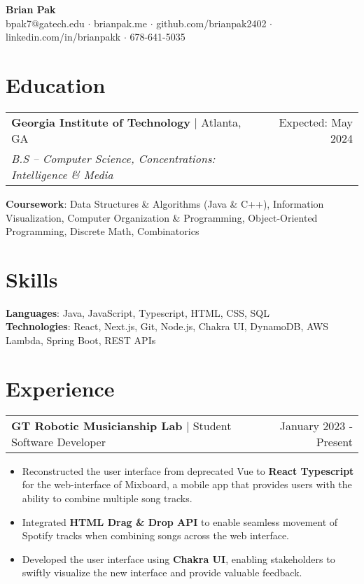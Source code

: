 \documentclass[letterpaper,11pt]{article}
\makeatletter
\newcommand{\resumeEducationHeading}[5]{
    \begin{tabular*}{0.99\textwidth}[t]{l@{\extracolsep{\fill}}r}
      \textbf{#1} $\vert$ #2 & #3 \\
      \textit{\small#4} & \textit{\small #5} \\
    \end{tabular*}\vspace{12.5pt}
}
\newcommand{\resumeExperienceHeading}[3]{
    \begin{tabular*}{0.99\textwidth}[t]{l@{\extracolsep{\fill}}r}
      \textbf{#1} $\vert$ {#2} & {#3} \\
    \end{tabular*}\vspace{-3pt}
}
\newcommand{\resumeItemListStart}{\begin{itemize}[noitemsep]\vspace{-4pt}}
\newcommand{\resumeItemListEnd}{\end{itemize}}
\makeatother
\begin{document}
\begin{center}
  \textbf{\huge Brian Pak} \\
  \vspace*{0.1cm}
  {bpak7@gatech.edu} $\cdot$ {brianpak.me} $\cdot$ {github.com/brianpak2402} $\cdot$ {linkedin.com/in/brianpakk}  $\cdot$ 678-641-5035 
\end{center}

\section{Education}
    \resumeEducationHeading
      {Georgia Institute of Technology}{Atlanta, GA}{Expected: May 2024}
      {B.S -- Computer Science, Concentrations: Intelligence \& Media}{\vspace{0.1cm} } %
    \textbf{Coursework}{: Data Structures \& Algorithms (Java \& C++), Information Visualization, Computer Organization \& Programming, Object-Oriented Programming, Discrete Math, Combinatorics} \\

\section{Skills}
    \textbf{Languages}{: Java, JavaScript, Typescript, HTML, CSS, SQL } \\
    \textbf{Technologies}{: React, Next.js, Git, Node.js, Chakra UI, DynamoDB, AWS Lambda, Spring Boot, REST APIs}

\section{Experience}
  \resumeExperienceHeading{GT Robotic Musicianship Lab}{Student Software Developer}{January 2023 - Present}
    \resumeItemListStart
      \item {Reconstructed the user interface from deprecated Vue to \textbf{React Typescript} for the web-interface of Mixboard, a mobile app that provides users with the ability to combine multiple song tracks.}
      \item {Integrated \textbf{HTML Drag \& Drop API} to enable seamless movement of Spotify tracks when combining songs across the web interface.}
      \item {Developed the user interface using \textbf{Chakra UI}, enabling stakeholders to swiftly visualize the new interface and provide valuable feedback.}
    \resumeItemListEnd
  
\end{document}
